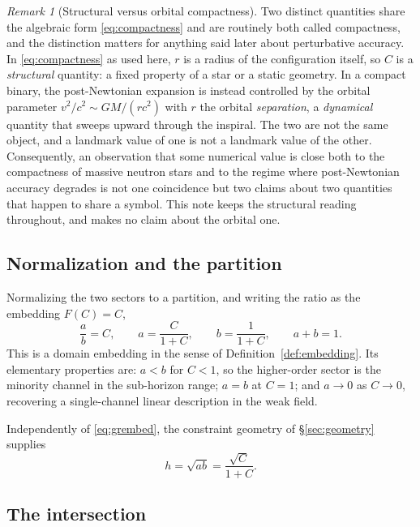 \documentclass[11pt,a4paper]{article}
\theoremstyle{definition}
\theoremstyle{plain}
\theoremstyle{remark}
\newtheorem{remark}[definition]{Remark}
\begin{document}
\begin{remark}[Structural versus orbital compactness]
\label{rem:structural}
Two distinct quantities share the algebraic form \eqref{eq:compactness} and are
routinely both called compactness, and the distinction matters for anything said
later about perturbative accuracy. In \eqref{eq:compactness} as used here, $r$
is a radius of the configuration itself, so $C$ is a \emph{structural} quantity:
a fixed property of a star or a static geometry. In a compact binary, the
post-Newtonian expansion is instead controlled by the orbital parameter
$v^{2}/c^{2}\sim GM/(rc^{2})$ with $r$ the orbital \emph{separation}, a
\emph{dynamical} quantity that sweeps upward through the inspiral. The two are
not the same object, and a landmark value of one is not a landmark value of the
other. Consequently, an observation that some numerical value is close both to
the compactness of massive neutron stars and to the regime where post-Newtonian
accuracy degrades is not one coincidence but two claims about two quantities
that happen to share a symbol. This note keeps the structural reading
throughout, and makes no claim about the orbital one.
\end{remark}

\subsection{Normalization and the partition}

Normalizing the two sectors to a partition, and writing the ratio as the
embedding $F(C)=C$,
\begin{equation}
\frac{a}{b}=C,
\qquad
a=\frac{C}{1+C},
\qquad
b=\frac{1}{1+C},
\qquad
a+b=1 .
\label{eq:grembed}
\end{equation}
This is a domain embedding in the sense of Definition~\ref{def:embedding}. Its
elementary properties are: $a<b$ for $C<1$, so the higher-order sector is the
minority channel in the sub-horizon range; $a=b$ at $C=1$; and $a\to 0$ as
$C\to 0$, recovering a single-channel linear description in the weak field.

Independently of \eqref{eq:grembed}, the constraint geometry of
\S\ref{sec:geometry} supplies
\begin{equation}
h=\sqrt{ab}=\frac{\sqrt C}{1+C} .
\label{eq:grh}
\end{equation}

\subsection{The intersection}
\end{document}
